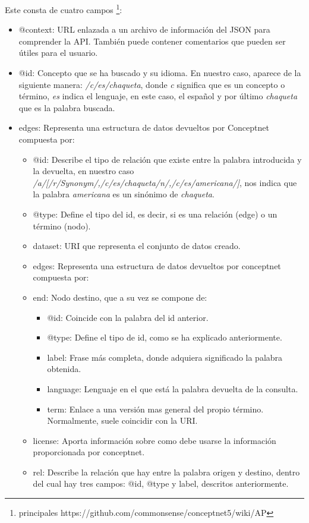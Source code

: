 Este consta de cuatro campos \footnote{principales https://github.com/commonsense/conceptnet5/wiki/AP}:
\begin{itemize}
	\item @context: URL enlazada a un archivo de información del JSON para comprender la API. También puede contener comentarios que pueden ser útiles para el usuario.
	\item @id: Concepto que se ha buscado y su idioma. En nuestro caso, aparece de la siguiente manera: \textit{/c/es/chaqueta}, donde  \textit{c} significa que es un concepto o término,  \textit{es} indica el lenguaje, en este caso, el español y por último \textit{chaqueta} que es la palabra buscada.
	\item edges: Representa una estructura de datos devueltos por Conceptnet compuesta por:
	\begin{itemize}
		\item @id: Describe el tipo de relación que existe entre la palabra introducida y la devuelta, en nuestro caso \textit{/a/[/r/Synonym/,/c/es/chaqueta/n/,/c/es/americana/]}, nos indica que la palabra \textit{americana} es un sinónimo de \textit{chaqueta}.
		\item @type: Define el tipo del id, es decir, si es una relación (edge) o un término (nodo).
		\item dataset: URI que representa el conjunto de datos creado.
		\item edges: Representa una estructura de datos devueltos por conceptnet compuesta por:
		\item end: Nodo destino, que a su vez se compone de:	
		\begin{itemize}
			\item @id: Coincide con la palabra del id anterior.
			\item @type: Define el tipo de id, como se ha explicado anteriormente.
			\item label: Frase más completa, donde adquiera significado la palabra obtenida.
			\item language: Lenguaje en el que está la palabra devuelta de la consulta.
			\item term: Enlace a una versión mas general del propio término. Normalmente, suele coincidir con la URI.			
		\end{itemize}
		\item license: Aporta información sobre como debe usarse la información proporcionada por conceptnet.
		\item rel: Describe la relación que hay entre la palabra origen y destino, dentro del cual hay tres campos: @id, @type y label, descritos anteriormente.

\end{itemize}
\end{itemize}
